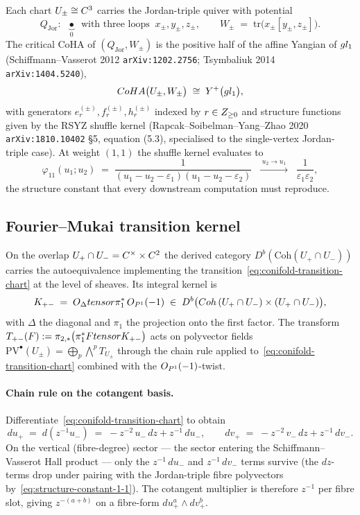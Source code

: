 Each chart $U_\pm \cong C^3$ carries the Jordan-triple quiver with
potential
\[
  Q_{\mathrm{Jor}} : \;\; \underbrace{\bullet}_{0}
  \;\;\text{with three loops}\;\; x_\pm, y_\pm, z_\pm,
  \qquad
  W_\pm \;=\; \mathrm{tr}\bigl(x_\pm[y_\pm, z_\pm]\bigr).
\]
The critical CoHA of $(Q_{\mathrm{Jor}}, W_\pm)$ is the positive half of the
affine Yangian of $gl_1$ (Schiffmann--Vasserot 2012
\texttt{arXiv:1202.2756}; Tsymbaliuk 2014 \texttt{arXiv:1404.5240}),
\[
  CoHA\bigl(U_\pm, W_\pm\bigr) \;\cong\; Y^+\bigl(gl_1\bigr),
\]
with generators $e_r^{(\pm)}, f_r^{(\pm)}, h_r^{(\pm)}$ indexed by $r \in
Z_{\geq 0}$ and structure functions given by the RSYZ shuffle kernel
(Rapcak--Soibelman--Yang--Zhao 2020 \texttt{arXiv:1810.10402} \S5,
equation (5.3), specialised to the single-vertex Jordan-triple case).
At weight $(1,1)$ the shuffle kernel evaluates to
\begin{equation}\label{eq:structure-constant-1-1}
  \varphi_{11}(u_1; u_2) \;=\; \frac{1}{(u_1 - u_2 - \varepsilon_1)(u_1 - u_2 - \varepsilon_2)}
  \;\;\xrightarrow{\;u_2 \to u_1\;}\;\;
  \frac{1}{\varepsilon_1 \varepsilon_2},
\end{equation}
the structure constant that every downstream computation must reproduce.

\subsection{Fourier--Mukai transition kernel}

On the overlap $U_+ \cap U_- = C^\times \times C^2$ the derived category
$D^b(\mathrm{Coh}(U_+ \cap U_-))$ carries the autoequivalence implementing
the transition~\eqref{eq:conifold-transition-chart} at the level of sheaves.
Its integral kernel is
\begin{equation}\label{eq:FM-kernel-conifold}
  K_{+-} \;=\; O_\Delta tensor \pi_1^*\,O_{P^1}(-1)
  \;\in\; D^b\bigl(Coh\,(U_+ \cap U_-) \times (U_+ \cap U_-)\bigr),
\end{equation}
with $\Delta$ the diagonal and $\pi_1$ the projection onto the first factor.
The transform $T_{+-}(F) := \pi_{2,*}\bigl(\pi_1^*F tensor K_{+-}\bigr)$
acts on polyvector fields
$\mathrm{PV}^\bullet(U_\pm) = \bigoplus_p \bigwedge^p T_{U_\pm}$ through the
chain rule applied to~\eqref{eq:conifold-transition-chart} combined with the
$O_{P^1}(-1)$-twist.

\paragraph{Chain rule on the cotangent basis.}
Differentiate~\eqref{eq:conifold-transition-chart} to obtain
\[
  du_+ \;=\; d(z^{-1} u_-) \;=\; -z^{-2}\, u_-\, dz + z^{-1}\, du_-,
  \qquad
  dv_+ \;=\; -z^{-2}\, v_-\, dz + z^{-1}\, dv_-.
\]
On the vertical (fibre-degree) sector --- the sector entering the
Schiffmann--Vasserot Hall product --- only the $z^{-1}\,du_-$ and
$z^{-1}\,dv_-$ terms survive (the $dz$-terms drop under pairing with the
Jordan-triple fibre polyvectors by~\eqref{eq:structure-constant-1-1}).
The cotangent multiplier is therefore $z^{-1}$ per fibre slot, giving
$z^{-(a+b)}$ on a fibre-form $du_+^a \wedge dv_+^b$.


